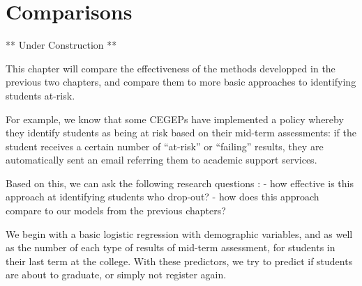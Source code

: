 \documentclass[]{book}
\theoremstyle{definition}
\theoremstyle{definition}
\theoremstyle{remark}
\begin{document}
\hypertarget{comparisons}{\chapter{Comparisons}\label{comparisons}}

** Under Construction **

This chapter will compare the effectiveness of the methods developped in
the previous two chapters, and compare them to more basic approaches to
identifying students at-risk.

For example, we know that some CEGEPs have implemented a policy whereby
they identify students as being at risk based on their mid-term
assessments: if the student receives a certain number of ``at-risk'' or
``failing'' results, they are automatically sent an email referring them
to academic support services.

Based on this, we can ask the following research questions : - how
effective is this approach at identifying students who drop-out? - how
does this approach compare to our models from the previous chapters?

We begin with a basic logistic regression with demographic variables,
and as well as the number of each type of results of mid-term
assessment, for students in their last term at the college. With these
predictors, we try to predict if students are about to graduate, or
simply not register again.
\end{document}
